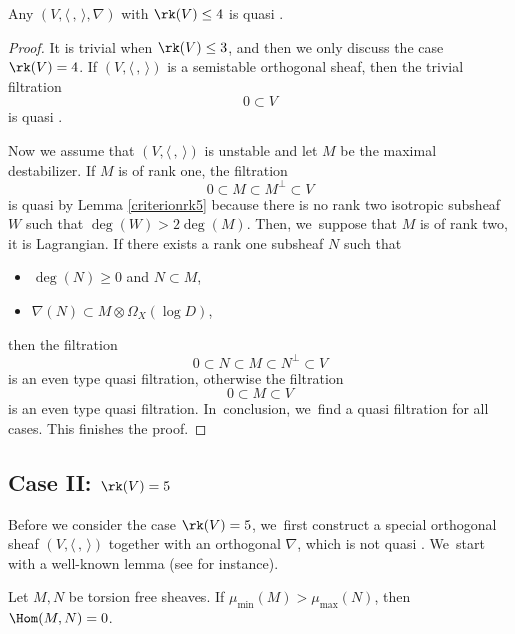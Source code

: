 \begin{prop}\label{rank4}
Any $(V, \langle \,, \, \rangle, \nabla)$ with $\rk(V) \leq 4$ is quasi \grsemistable.
\end{prop}

\begin{proof}
It is trivial when $\rk(V)\leq3$, and then we only discuss the case $\rk(V)=4$. If $(V, \langle \,, \, \rangle)$ is a semistable orthogonal sheaf, then the trivial filtration\vspace*{-3pt}
\[
0\subset V
\]
is quasi \grsemistable.

Now we assume that $(V, \langle \,, \, \rangle)$ is unstable and let $M$ be the maximal destabilizer. If $M$ is of rank one, the filtration\vspace*{-3pt}
\[
0\subset M\subset M^\perp\subset V
\]
is quasi \grsemistable by Lemma \ref{criterionrk5} because there is no rank two isotropic subsheaf~$W$ such that $\deg(W) > 2 \deg(M)$. Then, we~suppose that $M$ is of rank two, \ie it is Lagrangian. If there exists a rank one subsheaf $N$ such that
\begin{itemize}
\item $\deg(N) \geq 0$ and $N \subset M$,
\item $\nabla(N) \subset M\otimes \Omega_X(\log D)$,
\end{itemize}
then the filtration\vspace*{-3pt}
\[
0\subset N\subset M\subset N^\perp\subset V
\]
is an even type quasi \grsemistable filtration, otherwise the filtration\vspace*{-3pt}
\[
0\subset M\subset V
\]
is an even type quasi \grsemistable filtration. In~conclusion, we~find a quasi \grsemistable filtration for all cases. This finishes the proof.
\end{proof}

\subsection{Case II: ${\rk(V) = 5}$}\label{subsect_rak_5}
Before we consider the case $\rk(V)=5$, we~first construct a special orthogonal sheaf $(V, \langle \,, \, \rangle)$ together with an orthogonal \lconnection $\nabla$, which is not quasi \grsemistable. We~start with a well-known lemma (see \cite[Lem.\,1.3.3]{HL97} for instance).

\begin{lem}\label{lem_max_min}
Let $M, N$ be torsion free sheaves. If $\mu_{\min}(M) > \mu_{\max}(N)$, then $\Hom(M,N) = 0$.
\end{lem}

